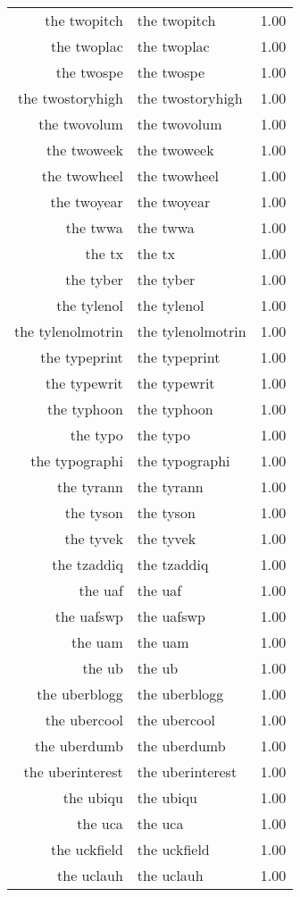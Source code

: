 \begin{table}[ht]
\begin{tabular}{rlr}
  the twopitch & the twopitch & 1.00 \\ 
  the twoplac & the twoplac & 1.00 \\ 
  the twospe & the twospe & 1.00 \\ 
  the twostoryhigh & the twostoryhigh & 1.00 \\ 
  the twovolum & the twovolum & 1.00 \\ 
  the twoweek & the twoweek & 1.00 \\ 
  the twowheel & the twowheel & 1.00 \\ 
  the twoyear & the twoyear & 1.00 \\ 
  the twwa & the twwa & 1.00 \\ 
  the tx & the tx & 1.00 \\ 
  the tyber & the tyber & 1.00 \\ 
  the tylenol & the tylenol & 1.00 \\ 
  the tylenolmotrin & the tylenolmotrin & 1.00 \\ 
  the typeprint & the typeprint & 1.00 \\ 
  the typewrit & the typewrit & 1.00 \\ 
  the typhoon & the typhoon & 1.00 \\ 
  the typo & the typo & 1.00 \\ 
  the typographi & the typographi & 1.00 \\ 
  the tyrann & the tyrann & 1.00 \\ 
  the tyson & the tyson & 1.00 \\ 
  the tyvek & the tyvek & 1.00 \\ 
  the tzaddiq & the tzaddiq & 1.00 \\ 
  the uaf & the uaf & 1.00 \\ 
  the uafswp & the uafswp & 1.00 \\ 
  the uam & the uam & 1.00 \\ 
  the ub & the ub & 1.00 \\ 
  the uberblogg & the uberblogg & 1.00 \\ 
  the ubercool & the ubercool & 1.00 \\ 
  the uberdumb & the uberdumb & 1.00 \\ 
  the uberinterest & the uberinterest & 1.00 \\ 
  the ubiqu & the ubiqu & 1.00 \\ 
  the uca & the uca & 1.00 \\ 
  the uckfield & the uckfield & 1.00 \\ 
  the uclauh & the uclauh & 1.00 \\ 

\end{tabular}
\end{table}
